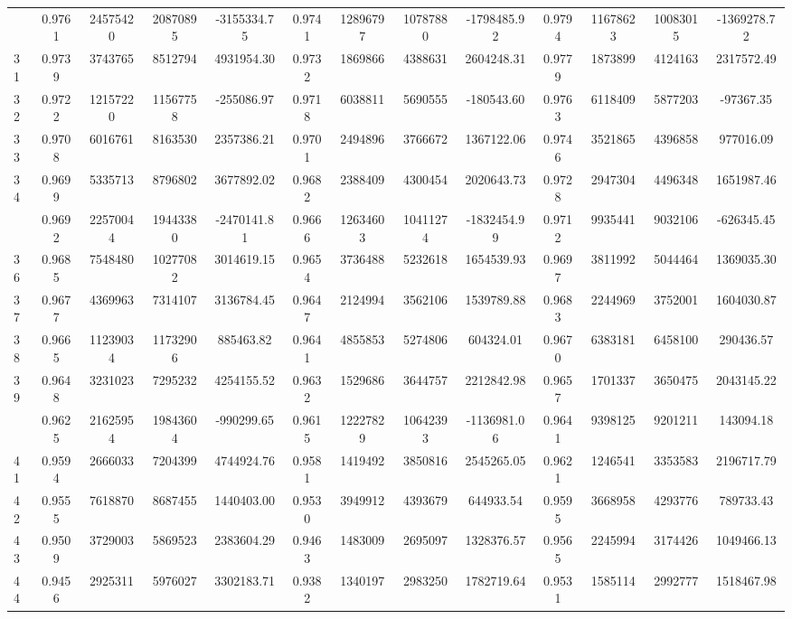 \documentclass[
  12pt,
]{article}
\begin{document}
\begin{longtable}[t]{lcccccccccccc}
\addlinespace
30 & 0.9761 & 24575420 & 20870895 & -3155334.75 & 0.9741 & 12896797 & 10787880 & -1798485.92 & 0.9794 & 11678623 & 10083015 & -1369278.72\\
31 & 0.9739 & 3743765 & 8512794 & 4931954.30 & 0.9732 & 1869866 & 4388631 & 2604248.31 & 0.9779 & 1873899 & 4124163 & 2317572.49\\
32 & 0.9722 & 12157220 & 11567758 & -255086.97 & 0.9718 & 6038811 & 5690555 & -180543.60 & 0.9763 & 6118409 & 5877203 & -97367.35\\
33 & 0.9708 & 6016761 & 8163530 & 2357386.21 & 0.9701 & 2494896 & 3766672 & 1367122.06 & 0.9746 & 3521865 & 4396858 & 977016.09\\
34 & 0.9699 & 5335713 & 8796802 & 3677892.02 & 0.9682 & 2388409 & 4300454 & 2020643.73 & 0.9728 & 2947304 & 4496348 & 1651987.46\\
\addlinespace
35 & 0.9692 & 22570044 & 19443380 & -2470141.81 & 0.9666 & 12634603 & 10411274 & -1832454.99 & 0.9712 & 9935441 & 9032106 & -626345.45\\
36 & 0.9685 & 7548480 & 10277082 & 3014619.15 & 0.9654 & 3736488 & 5232618 & 1654539.93 & 0.9697 & 3811992 & 5044464 & 1369035.30\\
37 & 0.9677 & 4369963 & 7314107 & 3136784.45 & 0.9647 & 2124994 & 3562106 & 1539789.88 & 0.9683 & 2244969 & 3752001 & 1604030.87\\
38 & 0.9665 & 11239034 & 11732906 & 885463.82 & 0.9641 & 4855853 & 5274806 & 604324.01 & 0.9670 & 6383181 & 6458100 & 290436.57\\
39 & 0.9648 & 3231023 & 7295232 & 4254155.52 & 0.9632 & 1529686 & 3644757 & 2212842.98 & 0.9657 & 1701337 & 3650475 & 2043145.22\\
\addlinespace
40 & 0.9625 & 21625954 & 19843604 & -990299.65 & 0.9615 & 12227829 & 10642393 & -1136981.06 & 0.9641 & 9398125 & 9201211 & 143094.18\\
41 & 0.9594 & 2666033 & 7204399 & 4744924.76 & 0.9581 & 1419492 & 3850816 & 2545265.05 & 0.9621 & 1246541 & 3353583 & 2196717.79\\
42 & 0.9555 & 7618870 & 8687455 & 1440403.00 & 0.9530 & 3949912 & 4393679 & 644933.54 & 0.9595 & 3668958 & 4293776 & 789733.43\\
43 & 0.9509 & 3729003 & 5869523 & 2383604.29 & 0.9463 & 1483009 & 2695097 & 1328376.57 & 0.9565 & 2245994 & 3174426 & 1049466.13\\
44 & 0.9456 & 2925311 & 5976027 & 3302183.71 & 0.9382 & 1340197 & 2983250 & 1782719.64 & 0.9531 & 1585114 & 2992777 & 1518467.98\\

\end{longtable}
\end{document}

